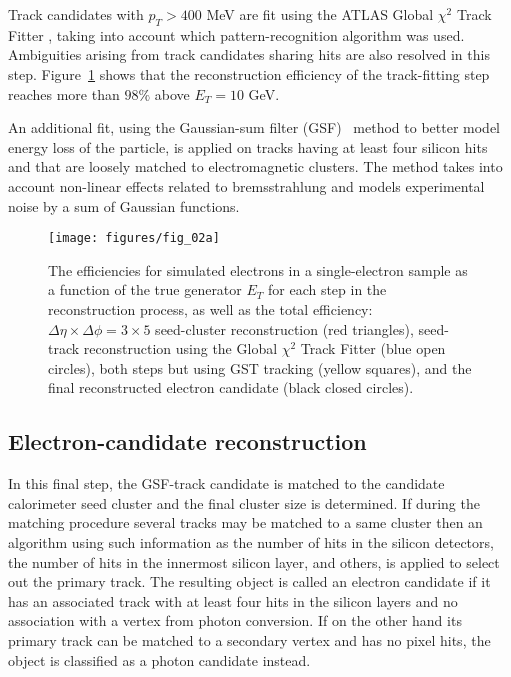 Track candidates with $p_T > 400$ MeV are fit using the ATLAS Global $\chi^2$
Track Fitter \cite{globalchisqfit}, taking into account which
pattern-recognition algorithm was used. Ambiguities arising from track
candidates sharing hits are also resolved in this step.
Figure~\ref{f:elcidtrackeff} shows that the reconstruction efficiency of the
track-fitting step reaches more than $98\%$ above $E_T = 10$ GeV.

An additional fit, using the Gaussian-sum filter (GSF)~\cite{gsffit} method to
better model energy loss of the particle, is applied on tracks having at least
four silicon hits and that are loosely matched to electromagnetic clusters. The
method takes into account non-linear effects related to bremsstrahlung and
models experimental noise by a sum of Gaussian functions.


\begin{figure}[H]
	\texttt{[image: figures/fig\_02a]}
	\centering

	\caption{The efficiencies for simulated electrons in a single-electron
		sample as a function of the true generator $E_T$ for each step in the reconstruction
		process, as well as the total efficiency: $\Delta \eta\times \Delta \phi=3\times 5$ seed-cluster
		reconstruction (red triangles),
		seed-track reconstruction using the Global $\chi^2$ Track Fitter (blue open circles), both
		steps but using GST tracking (yellow squares), and the final reconstructed electron
		candidate (black closed circles).}

	\label{f:elcidtrackeff}

\end{figure}


\subsection{Electron-candidate reconstruction}

In this final step, the GSF-track candidate is matched to the candidate
calorimeter seed cluster and the final cluster size is determined. If during
the matching procedure several tracks may be matched to a same cluster then an
algorithm using such information as the number of hits in the silicon
detectors, the number of hits in the innermost silicon layer, and others, is
applied to select out the primary track. The resulting object is called an
electron candidate if it has an associated track with at least four hits in the
silicon layers and no association with a vertex from photon conversion. If on
the other hand its primary track can be matched to a secondary vertex and has
no pixel hits, the object is classified as a photon candidate instead.


